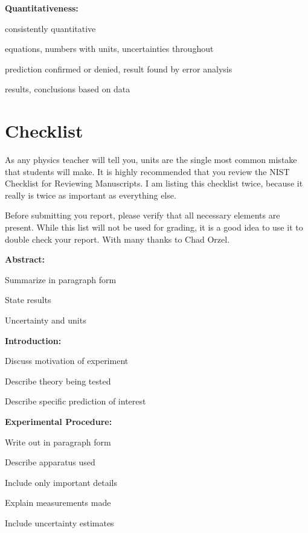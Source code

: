 \documentclass[
    10pt,aps,prl,
    amsfonts,
    amssymb,
    amsmath,
    draft,
    runinaddress,
    secnum,
    showkeys,
    superscriptaddress,
    twocolumn,
]{revtex4}
\begin{document}
    \textbf{Quantitativeness:}
    \begin{itemize*}
        \item consistently quantitative
        \item equations, numbers with units, uncertainties throughout
        \item prediction confirmed or denied, result found by error analysis
        \item results, conclusions based on data
    \end{itemize*}

\section{Checklist}
    As any physics teacher will tell you, units are the single most common mistake that students will make.
    It is highly recommended that you review the NIST Checklist for Reviewing Manuscripts\cite{NISTsp811}.
    I am listing this checklist twice, because it really is twice as important as everything else.

    Before submitting you report, please verify that all necessary elements are present.
    While this list will not be used for grading,
        it is a good idea to use it to double check your report.
    With many thanks to Chad Orzel\cite{Orzel}.

    \textbf{Abstract:}
    \begin{itemize*}[label=\square]
        \item Summarize in paragraph form
        \item State results
        \item Uncertainty and units
    \end{itemize*}

    \textbf{Introduction:}
    \begin{itemize*}[label=\square]
        \item Discuss motivation of experiment
        \item Describe theory being tested
        \item Describe specific prediction of interest
    \end{itemize*}

    \textbf{Experimental Procedure:}
    \begin{itemize*}[label=\square]
        \item Write out in paragraph form
        \item Describe apparatus used
        \item Include only important details
        \item Explain measurements made
        \item Include uncertainty estimates
    \end{itemize*}
\end{document}
